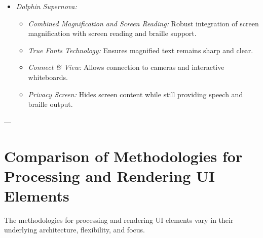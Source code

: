 \begin{itemize}
\begin{itemize}
    \end{itemize}
    \item \emph{Dolphin Supernova:}
    \begin{itemize}
        \item \emph{Combined Magnification and Screen Reading:} Robust integration of screen magnification with screen reading and braille support.\cite{SuperNovaFeatures}
        \item \emph{True Fonts Technology:} Ensures magnified text remains sharp and clear.\cite{SuperNovaFeatures}
        \item \emph{Connect \& View:} Allows connection to cameras and interactive whiteboards.\cite{SuperNovaFeatures}
        \item \emph{Privacy Screen:} Hides screen content while still providing speech and braille output.\cite{SuperNovaFeatures}
    \end{itemize}
\end{itemize}

---

\section{Comparison of Methodologies for Processing and Rendering UI Elements}
\label{sec:comparison-methodologies}

The methodologies for processing and rendering UI elements vary in their underlying architecture, flexibility, and focus.

